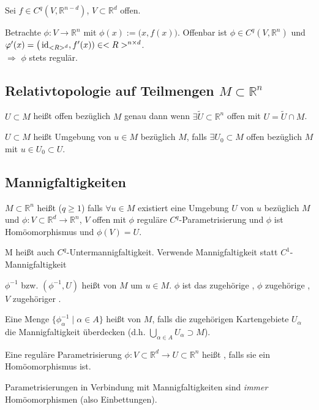 \begin{example}
	Sei $f\in C^q(V, \mathbb{R}^{n-d})$, $V\subset \mathbb{R}^d$ offen.
	
	Betrachte $\phi\!: V\to \mathbb{R}^n$ mit $\phi(x) := \big(x, f(x)\big)$. Offenbar ist $\phi \in C^q(V, \mathbb{R}^n)$ und $\varphi'(x) = \big( \operatorname{id}_{<R>^d}, f'(x)) \in <R>^{n\times d}$. \\
	$\Rightarrow$ $\phi$ stets regulär.
\end{example}

\subsection{Relativtopologie auf Teilmengen \texorpdfstring{$M\subset \mathbb{R}^n$}{M c R}}
\begin{*definition}
	$U\subset M$ heißt offen bezüglich $M$ genau dann wenn $\exists \tilde{U} \subset \mathbb{R}^n$ offen mit $U = \tilde{U} \cap M$.
	
	$U\subset M$ heißt Umgebung von $u\in M$ bezüglich $M$, falls $\exists U_0 \subset M$ offen bezüglich $M$ mit $u\in U_0 \subset U$.
\end{*definition}

\subsection{Mannigfaltigkeiten}
\begin{*definition}
	$M\subset \mathbb{R}^n$ heißt  ($q \ge 1$) falls $\forall u\in M$ existiert eine Umgebung $U$ von $u$ bezüglich $M$ und $\phi: V\subset \mathbb{R}^d \to \mathbb{R}^n$, $V$ offen mit $\phi$ reguläre $C^q$-Parametrisierung und $\phi$ ist Homöomorphismus und $\phi(V) = U$.
	
	M heißt auch $C^q$-Untermannigfaltigkeit. Verwende Mannigfaltigkeit statt $C^1$-Mannigfaltigkeit
\end{*definition}
\begin{*definition}
	$\phi^{-1}$ bzw. $(\phi^{-1}, U)$ heißt  von $M$ um $u\in M$. $\phi$ ist das zugehörige , $\phi$ zugehörige , $V$ zugehöriger .
	
	Eine Menge $\lbrace \phi^{-1}_\alpha \mid \alpha \in A\rbrace$ heißt  von $M$, falls die zugehörigen Kartengebiete $U_\alpha$ die Mannigfaltigkeit überdecken (d.h. $\bigcup_{\alpha\in A} U_\alpha \supset M$).
\end{*definition}
\begin{*definition}
	Eine reguläre Parametrisierung $\phi\!: V\subset \mathbb{R}^d\to U\subset \mathbb{R}^n$ heißt , falls sie ein Homöomorphismus ist.
\end{*definition}
\begin{underlinedenvironment}[Vereinbarung]
	Parametrisierungen in Verbindung mit Mannigfaltigkeiten sind \emph{immer} Homöomorphismen (also Einbettungen).
\end{underlinedenvironment}

